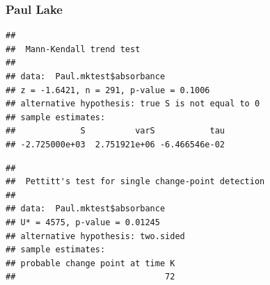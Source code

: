 \documentclass[12pt,]{article}
\newenvironment{Shaded}{\begin{snugshade}}{\end{snugshade}}
\newcommand{\KeywordTok}[1]{\textcolor[rgb]{0.13,0.29,0.53}{\textbf{#1}}}
\newcommand{\DecValTok}[1]{\textcolor[rgb]{0.00,0.00,0.81}{#1}}
\newcommand{\StringTok}[1]{\textcolor[rgb]{0.31,0.60,0.02}{#1}}
\newcommand{\CommentTok}[1]{\textcolor[rgb]{0.56,0.35,0.01}{\textit{#1}}}
\newcommand{\OperatorTok}[1]{\textcolor[rgb]{0.81,0.36,0.00}{\textbf{#1}}}
\newcommand{\NormalTok}[1]{#1}
\begin{document}
\subsubsection{Paul Lake}\label{paul-lake}

\begin{Shaded}
\end{Shaded}

\begin{verbatim}
## 
##  Mann-Kendall trend test
## 
## data:  Paul.mktest$absorbance
## z = -1.6421, n = 291, p-value = 0.1006
## alternative hypothesis: true S is not equal to 0
## sample estimates:
##             S          varS           tau 
## -2.725000e+03  2.751921e+06 -6.466546e-02
\end{verbatim}

\begin{Shaded}
\end{Shaded}

\begin{verbatim}
## 
##  Pettitt's test for single change-point detection
## 
## data:  Paul.mktest$absorbance
## U* = 4575, p-value = 0.01245
## alternative hypothesis: two.sided
## sample estimates:
## probable change point at time K 
##                              72
\end{verbatim}

\begin{Shaded}
\end{Shaded}
\end{document}
